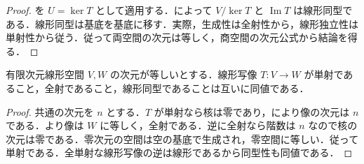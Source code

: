 \begin{proof}
を $U=\ker T$ として適用する．によって $V/\ker T$ と $\operatorname{Im}T$ は線形同型である．線形同型は基底を基底に移す．実際，生成性は全射性から，線形独立性は単射性から従う．従って両空間の次元は等しく，商空間の次元公式から結論を得る．
\end{proof}
\begin{prop}[同次元の線形空間の間の線形写像]
有限次元線形空間 $V,W$ の次元が等しいとする．線形写像 $T:V\to W$ が単射であること，全射であること，線形同型であることは互いに同値である．
\end{prop}
\begin{proof}
共通の次元を $n$ とする．$T$ が単射なら核は零であり，により像の次元は $n$ である．より像は $W$ に等しく，全射である．逆に全射なら階数は $n$ なので核の次元は零である．零次元の空間は空の基底で生成され，零空間に等しい．従って単射である．全単射な線形写像の逆は線形であるから同型性も同値である．
\end{proof}

